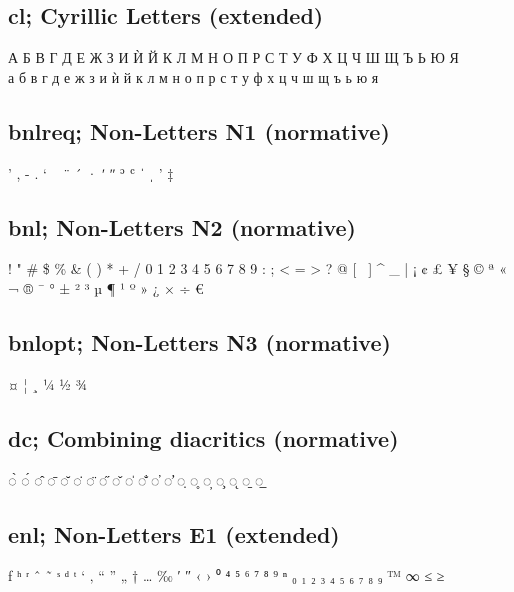 \subsection{cl; Cyrillic Letters (extended)}

А Б В Г Д Е Ж З И Ѝ Й К Л М Н О П Р С Т У Ф Х Ц Ч Ш Щ Ъ Ь Ю Я\\
а б в г д е ж з и ѝ й к л м н о п р с т у ф х ц ч ш щ ъ ь ю я  

\subsection{bnlreq; Non-Letters N1 (normative)}

  ' , - . ` ~ ¨ ´ · ʹ ʺ ʾ ʿ ˈ ˌ ’ ‡ 

\subsection{bnl; Non-Letters N2 (normative)}

! " \# \$ \% \& ( ) * + / 0 1 2 3 4 5 6 7 8 9 : ; < = > 
? @ [ \ ] \textasciicircum{} \_ { | } ¡ ¢ £ ¥ § © ª « ¬ ® ¯ ° ± ² ³ µ 
¶ ¹ º » ¿ × ÷ € 

\subsection{bnlopt; Non-Letters N3 (normative)}

¤ ¦ ¸ ¼ ½ ¾ 

\subsection{dc; Combining diacritics (normative)}

◌̀ ◌́ ◌̂ ◌̄ ◌̆ ◌̇ ◌̈ ◌̋ ◌̌ ◌̍ ◌̐ ◌̕ ◌̛ ◌̣ ◌̥ ◌̦ ◌̧ ◌̨ ◌̱ ◌̲

\subsection{enl; Non-Letters E1 (extended)}

ƒ ʰ ʳ ˆ ˜ ˢ ᵈ ᵗ ‘ ‚ “ ” „ † … ‰ ′ ″ ‹ › ⁰ ⁴ ⁵ ⁶ ⁷ ⁸ ⁹ ⁿ ₀ ₁ ₂ ₃ ₄ ₅ ₆ ₇ ₈ ₉ ™ ∞ ≤ ≥ 
